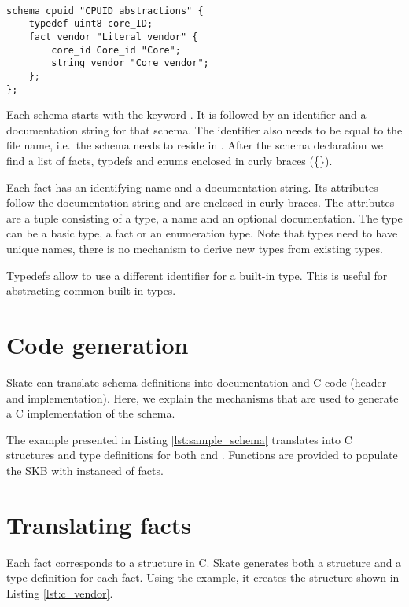 \documentclass[a4paper,11pt,twoside]{report}
\begin{document}
{{\begin{lstlisting}[caption={Sample Skate schema definition},
label={lst:sample_schema},language=Skate]

schema cpuid "CPUID abstractions" {
    typedef uint8 core_ID;
    fact vendor "Literal vendor" {
        core_id Core_id "Core";
        string vendor "Core vendor";
    };
};
\end{lstlisting}

Each schema starts with the keyword . It is followed by an
identifier and a documentation string for that schema. The identifier also needs
to be equal to the file name, i.e.~the schema  needs to reside in
. After the schema declaration we find a list of facts,
typdefs and enums enclosed in curly braces (\{\}).

Each fact has an identifying name and a documentation string. Its attributes
follow the documentation string and are enclosed in curly braces. The attributes
are a tuple consisting of a type, a name and an optional documentation. The type
can be a basic type, a fact or an enumeration type. Note that types need to have
unique names, there is no mechanism to derive new types from existing types.

Typedefs allow to use a different identifier for a built-in type. This is useful
for abstracting common built-in types.


\section{Code generation}

Skate can translate schema definitions into documentation and C code (header
and implementation). Here, we explain the mechanisms that are used to generate a
C implementation of the schema.

The example presented in Listing \ref{lst:sample_schema} translates into C
structures and type definitions for both  and
. Functions are provided to populate the SKB with instanced of
facts.

\section{Translating facts}

Each fact corresponds to a structure in C. Skate generates both a structure
and a type definition for each fact. Using the example, it creates the
structure shown in Listing \ref{lst:c_vendor}.

}}
\end{document}
